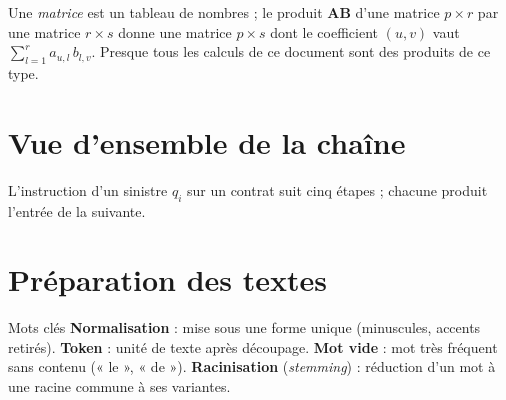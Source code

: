\documentclass[11pt,a4paper]{article}
\newcommand{\mat}[1]{\mathbf{#1}}
\begin{document}
\noindent Une \emph{matrice} est un tableau de nombres ; le produit $\mat{A}\mat{B}$ d'une matrice
$p\times r$ par une matrice $r\times s$ donne une matrice $p\times s$ dont le coefficient
$(u,v)$ vaut $\sum_{l=1}^{r} a_{u,l}\,b_{l,v}$. Presque tous les calculs de ce document sont des
produits de ce type.

\section{Vue d'ensemble de la chaîne}

L'instruction d'un sinistre $q_i$ sur un contrat suit cinq étapes ; chacune produit l'entrée de la
suivante.

\begin{center}
\end{center}

\section{Préparation des textes}

\begin{defbox}{Mots clés}
\textbf{Normalisation} : mise sous une forme unique (minuscules, accents retirés).
\textbf{Token} : unité de texte après découpage. \textbf{Mot vide} : mot très fréquent sans
contenu (« le », « de »). \textbf{Racinisation} (\emph{stemming}) : réduction d'un mot à une racine
commune à ses variantes.
\end{defbox}
\end{document}
